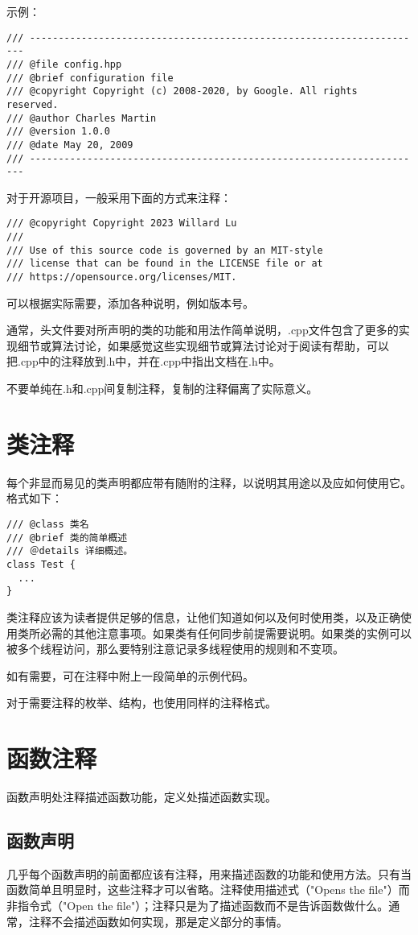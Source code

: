 示例：
\begin{verbatim}
/// ---------------------------------------------------------------------
/// @file config.hpp
/// @brief configuration file
/// @copyright Copyright (c) 2008-2020, by Google. All rights reserved.
/// @author Charles Martin
/// @version 1.0.0
/// @date May 20, 2009
/// ---------------------------------------------------------------------
\end{verbatim}

对于开源项目，一般采用下面的方式来注释：
\begin{verbatim}
/// @copyright Copyright 2023 Willard Lu
///
/// Use of this source code is governed by an MIT-style
/// license that can be found in the LICENSE file or at
/// https://opensource.org/licenses/MIT.
\end{verbatim}
可以根据实际需要，添加各种说明，例如版本号。

通常，头文件要对所声明的类的功能和用法作简单说明，.cpp文件包含了更多的实现细节或算法讨论，如果感觉这些实现细节或算法讨论对于阅读有帮助，可以把.cpp中的注释放到.h中，并在.cpp中指出文档在.h中。

不要单纯在.h和.cpp间复制注释，复制的注释偏离了实际意义。


\section{类注释}
每个非显而易见的类声明都应带有随附的注释，以说明其用途以及应如何使用它。格式如下：
\begin{verbatim}
/// @class 类名
/// @brief 类的简单概述
/// ＠details 详细概述。
class Test {
  ...
}
\end{verbatim}

类注释应该为读者提供足够的信息，让他们知道如何以及何时使用类，以及正确使用类所必需的其他注意事项。如果类有任何同步前提需要说明。如果类的实例可以被多个线程访问，那么要特别注意记录多线程使用的规则和不变项。

如有需要，可在注释中附上一段简单的示例代码。

对于需要注释的枚举、结构，也使用同样的注释格式。


\section{函数注释}
函数声明处注释描述函数功能，定义处描述函数实现。

\subsection{函数声明}
几乎每个函数声明的前面都应该有注释，用来描述函数的功能和使用方法。只有当函数简单且明显时，这些注释才可以省略。注释使用描述式（"Opens the file"）而非指令式（"Open the file"）；注释只是为了描述函数而不是告诉函数做什么。通常，注释不会描述函数如何实现，那是定义部分的事情。

